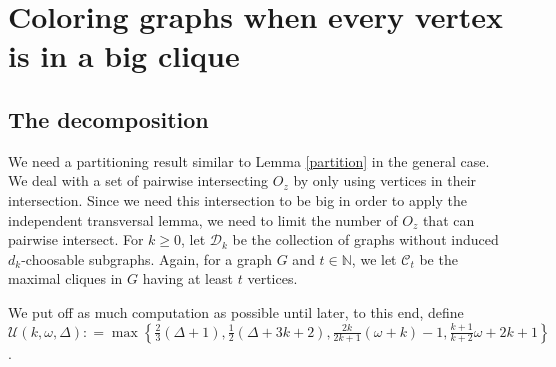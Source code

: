 \documentclass[12pt]{article}
\theoremstyle{plain}
\theoremstyle{definition}
\theoremstyle{remark}
\newcommand{\fancy}[1]{\mathcal{#1}}
\newcommand{\IN}{\mathbb{N}}
\newcommand{\CC}{\fancy{C}}
\newcommand{\D}{\fancy{D}}
\newcommand{\set}[1]{\left\{ #1 \right\}}
\newcommand{\DefinedAs}{\mathrel{\mathop:}=}
\def\D{\fancy{D}}
\begin{document}
\section{Coloring graphs when every vertex is in a big clique}

\subsection{The decomposition}
We need a partitioning result similar to Lemma \ref{partition} in the general case.  We deal with a set of pairwise intersecting $O_z$ by only using vertices in their intersection.  Since we need this intersection to be big in order to apply the independent transversal lemma, we need to limit the number of $O_z$ that can pairwise intersect.  For $k \geq 0$, let $\D_k$ be the collection of graphs without induced $d_k$-choosable
subgraphs. Again, for a graph $G$ and $t \in \IN$, we let $\CC_t$ be the maximal cliques in $G$ having at least $t$ vertices. 

We put off as much computation as possible until later, to this end, define $\fancy{U}(k, \omega, \Delta) \DefinedAs \max\set{\frac23 (\Delta + 1), \frac12 (\Delta + 3k + 2), \frac{2k}{2k+1}(\omega + k) - 1, \frac{k+1}{k+2}\omega + 2k + 1}$.
\end{document}
